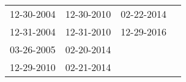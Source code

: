 \begin{supertabular}{llll}
 12-30-2004 &  12-30-2010 &  02-22-2014 \\
 12-31-2004 &  12-31-2010 &  12-29-2016 \\
 03-26-2005 &  02-20-2014 &             \\
 12-29-2010 &  02-21-2014 &             \\
\end{supertabular}
